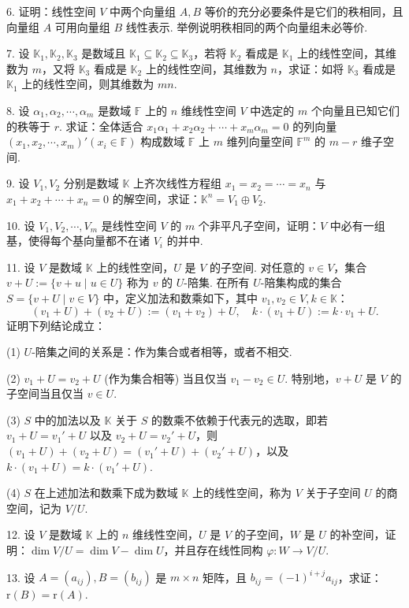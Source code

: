 \documentclass[UTF8,12pt,a4paper,fontset=fandol]{ctexart}
\begin{document}
6. 证明：线性空间 $V$ 中两个向量组 $A,B$ 等价的充分必要条件是它们的秩相同，且向量组 $A$ 可用向量组 $B$ 线性表示. 举例说明秩相同的两个向量组未必等价.

7. 设 $\mathbb{K}_1,\mathbb{K}_2,\mathbb{K}_3$ 是数域且 $\mathbb{K}_1\subseteq\mathbb{K}_2\subseteq\mathbb{K}_3$，若将 $\mathbb{K}_2$ 看成是 $\mathbb{K}_1$ 上的线性空间，其维数为 $m$，又将 $\mathbb{K}_3$ 看成是 $\mathbb{K}_2$ 上的线性空间，其维数为 $n$，求证：如将 $\mathbb{K}_3$ 看成是 $\mathbb{K}_1$ 上的线性空间，则其维数为 $mn$.

8. 设 $\alpha_1,\alpha_2,\cdots,\alpha_m$ 是数域 $\mathbb{F}$ 上的 $n$ 维线性空间 $V$ 中选定的 $m$ 个向量且已知它们的秩等于 $r$. 求证：全体适合 $x_1\alpha_1+x_2\alpha_2+\cdots+x_m\alpha_m=0$ 的列向量 $(x_1,x_2,\cdots,x_m)'(x_i\in\mathbb{F})$ 构成数域 $\mathbb{F}$ 上 $m$ 维列向量空间 $\mathbb{F}^m$ 的 $m-r$ 维子空间.

9. 设 $V_1,V_2$ 分别是数域 $\mathbb{K}$ 上齐次线性方程组 $x_1=x_2=\cdots=x_n$ 与 $x_1+x_2+\cdots+x_n=0$ 的解空间，求证：$\mathbb{K}^n=V_1\oplus V_2$.

10. 设 $V_1,V_2,\cdots,V_m$ 是线性空间 $V$ 的 $m$ 个非平凡子空间，证明：$V$ 中必有一组基，使得每个基向量都不在诸 $V_i$ 的并中.

11. 设 $V$ 是数域 $\mathbb{K}$ 上的线性空间，$U$ 是 $V$ 的子空间. 对任意的 $v\in V$，集合 $v+U:=\{v+u\mid u\in U\}$ 称为 $v$ 的 $U$-陪集. 在所有 $U$-陪集构成的集合 $S=\{v+U\mid v\in V\}$ 中，定义加法和数乘如下，其中 $v_1,v_2\in V,k\in\mathbb{K}$：
\[
(v_1+U)+(v_2+U):=(v_1+v_2)+U,\quad k\cdot(v_1+U):=k\cdot v_1+U.
\]
证明下列结论成立：

(1) $U$-陪集之间的关系是：作为集合或者相等，或者不相交.

(2) $v_1+U=v_2+U$ (作为集合相等) 当且仅当 $v_1-v_2\in U$. 特别地，$v+U$ 是 $V$ 的子空间当且仅当 $v\in U$.

(3) $S$ 中的加法以及 $\mathbb{K}$ 关于 $S$ 的数乘不依赖于代表元的选取，即若 $v_1+U=v_1'+U$ 以及 $v_2+U=v_2'+U$，则 $(v_1+U)+(v_2+U)=(v_1'+U)+(v_2'+U)$，以及 $k\cdot(v_1+U)=k\cdot(v_1'+U)$.

(4) $S$ 在上述加法和数乘下成为数域 $\mathbb{K}$ 上的线性空间，称为 $V$ 关于子空间 $U$ 的商空间，记为 $V/U$.

12. 设 $V$ 是数域 $\mathbb{K}$ 上的 $n$ 维线性空间，$U$ 是 $V$ 的子空间，$W$ 是 $U$ 的补空间，证明：$\dim V/U=\dim V-\dim U$，并且存在线性同构 $\varphi:W\to V/U$.

13. 设 $A=(a_{ij}),B=(b_{ij})$ 是 $m\times n$ 矩阵，且 $b_{ij}=(-1)^{i+j}a_{ij}$，求证：$\mathrm{r}(B)=\mathrm{r}(A)$.
\end{document}
